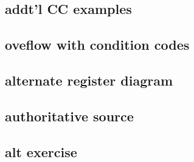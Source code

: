 \subsection{addt'l CC examples} %


\subsection{oveflow with condition codes}


\subsection{alternate register diagram}


\subsection{authoritative source}


\subsection{alt exercise}




